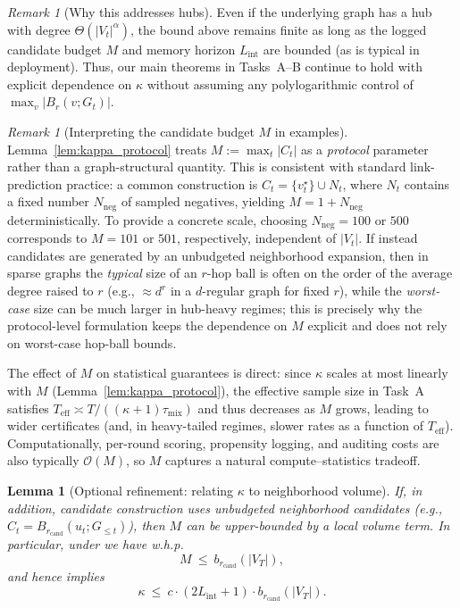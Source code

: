 \documentclass[11pt]{article}
\newcommand{\1}{\mathbf{1}}
\newcommand{\bigO}{\mathcal{O}}
\theoremstyle{plain}
\newtheorem{lemma}[theorem]{Lemma}
\theoremstyle{definition}
\theoremstyle{remark}
\newtheorem{remark}[theorem]{Remark}
\begin{document}
\begin{remark}[Why this addresses hubs]\label{rem:hubs}
Even if the underlying graph has a hub with degree $\Theta(|V_t|^\alpha)$,
the bound above remains finite as long as the logged candidate budget $M$ and
memory horizon $L_{\mathrm{int}}$ are bounded (as is typical in deployment).
Thus, our main theorems in Tasks~A--B continue to hold with explicit dependence on $\kappa$
without assuming any polylogarithmic control of $\max_v |B_r(v;G_t)|$.
\end{remark}
\begin{remark}[Interpreting the candidate budget $M$ in examples]\label{rem:M_examples}
Lemma~\ref{lem:kappa_protocol} treats $M:=\max_t |C_t|$ as a \emph{protocol} parameter rather than a graph-structural quantity.
This is consistent with standard link-prediction practice: a common construction is $C_t=\{v_t^\star\}\cup N_t$, where $N_t$
contains a fixed number $N_{\mathrm{neg}}$ of sampled negatives, yielding $M=1+N_{\mathrm{neg}}$ deterministically.
To provide a concrete scale, choosing $N_{\mathrm{neg}}=100$ or $500$ corresponds to $M=101$ or $501$, respectively, independent of $|V_t|$.
If instead candidates are generated by an unbudgeted neighborhood expansion, then in sparse graphs the \emph{typical} size of an $r$-hop ball
is often on the order of the average degree raised to $r$ (e.g., $\approx d^r$ in a $d$-regular graph for fixed $r$),
while the \emph{worst-case} size can be much larger in hub-heavy regimes; this is precisely why the protocol-level formulation
keeps the dependence on $M$ explicit and does not rely on worst-case hop-ball bounds.

The effect of $M$ on statistical guarantees is direct: since $\kappa$ scales at most linearly with $M$ (Lemma~\ref{lem:kappa_protocol}),
the effective sample size in Task~A satisfies $T_{\mathrm{eff}}\asymp T/((\kappa+1)\tau_{\mathrm{mix}})$ and thus decreases as $M$ grows,
leading to wider certificates (and, in heavy-tailed regimes, slower rates as a function of $T_{\mathrm{eff}}$).
Computationally, per-round scoring, propensity logging, and auditing costs are also typically $\bigO(M)$,
so $M$ captures a natural compute--statistics tradeoff.
\end{remark}



\begin{lemma}[Optional refinement: relating $\kappa$ to neighborhood volume]\label{lem:kappa_volume}
If, in addition, candidate construction uses \emph{unbudgeted} neighborhood candidates
(e.g., $C_t = B_{r_{\mathrm{cand}}}(u_t;G_{\le t})$), then $M$ can be upper-bounded by a local volume term.
In particular, under  we have w.h.p.
\[
M \ \le\ b_{r_{\mathrm{cand}}}(|V_T|) ,
\]
and hence  implies
\[
\kappa \ \le\ c\cdot (2L_{\mathrm{int}}+1)\cdot b_{r_{\mathrm{cand}}}(|V_T|).
\]
\end{lemma}
\end{document}
